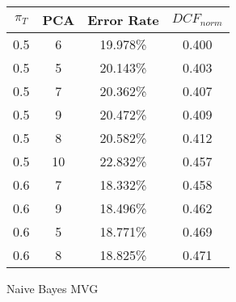 \begin{tabular}{|c|c|c|c|}
\hline
$\pi_T$ & PCA & Error Rate & $DCF_{norm}$\\
\hline
0.5 & 6 & 19.978\% & 0.400\\
\hline
0.5 & 5 & 20.143\% & 0.403\\
\hline
0.5 & 7 & 20.362\% & 0.407\\
\hline
0.5 & 9 & 20.472\% & 0.409\\
\hline
0.5 & 8 & 20.582\% & 0.412\\
\hline
0.5 & 10 & 22.832\% & 0.457\\
\hline
0.6 & 7 & 18.332\% & 0.458\\
\hline
0.6 & 9 & 18.496\% & 0.462\\
\hline
0.6 & 5 & 18.771\% & 0.469\\
\hline
0.6 & 8 & 18.825\% & 0.471\\
\hline
\end{tabular}
\caption{Naive Bayes MVG}\label{tab:mvg_naiveacctable}
